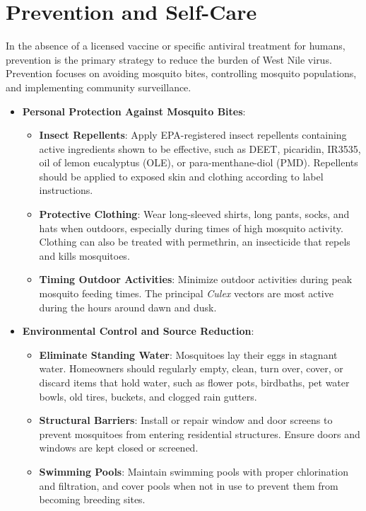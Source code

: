 \section*{Prevention and Self-Care}
In the absence of a licensed vaccine or specific antiviral treatment for humans, prevention is the primary strategy to reduce the burden of West Nile virus. Prevention focuses on avoiding mosquito bites, controlling mosquito populations, and implementing community surveillance.
\begin{itemize}
    \item \textbf{Personal Protection Against Mosquito Bites}:
    \begin{itemize}
        \item \textbf{Insect Repellents}: Apply EPA-registered insect repellents containing active ingredients shown to be effective, such as DEET, picaridin, IR3535, oil of lemon eucalyptus (OLE), or para-menthane-diol (PMD). Repellents should be applied to exposed skin and clothing according to label instructions.
        \item \textbf{Protective Clothing}: Wear long-sleeved shirts, long pants, socks, and hats when outdoors, especially during times of high mosquito activity. Clothing can also be treated with permethrin, an insecticide that repels and kills mosquitoes.
        \item \textbf{Timing Outdoor Activities}: Minimize outdoor activities during peak mosquito feeding times. The principal \textit{Culex} vectors are most active during the hours around dawn and dusk.
    \end{itemize}
    \item \textbf{Environmental Control and Source Reduction}:
    \begin{itemize}
        \item \textbf{Eliminate Standing Water}: Mosquitoes lay their eggs in stagnant water. Homeowners should regularly empty, clean, turn over, cover, or discard items that hold water, such as flower pots, birdbaths, pet water bowls, old tires, buckets, and clogged rain gutters.
        \item \textbf{Structural Barriers}: Install or repair window and door screens to prevent mosquitoes from entering residential structures. Ensure doors and windows are kept closed or screened.
        \item \textbf{Swimming Pools}: Maintain swimming pools with proper chlorination and filtration, and cover pools when not in use to prevent them from becoming breeding sites.

\end{itemize}
\end{itemize}
